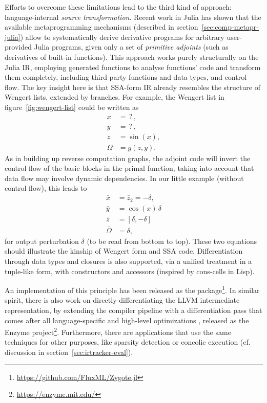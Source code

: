 Efforts to overcome these limitations lead to the third kind of approach: language-internal
\emph{source transformation}.  Recent work in Julia \parencite{innes2018don} has shown that the
available metaprogramming mechanisms (described in section~\ref{sec:comp-metapr-julia}) allow to
systematically derive derivative programs for arbitrary user-provided Julia programs, given only a
set of \emph{primitive adjoints} (such as derivatives of built-in functions).  This approach works
purely structurally on the Julia IR, employing generated functions to analyse functions' code and
transform them completely, including third-party functions and data types, and control flow.  The
key insight here is that SSA-form IR already resembles the structure of Wengert lists, extended by
branches.  For example, the Wengert list in figure~\ref{fig:wengert-list} could be written as
\begin{equation}
  \label{eq:ad-primal-0}
  \begin{aligned}
    x &= \operatorname{?}, \\
    y &= \operatorname{?}, \\
    z &= \sin(x), \\
    \Omega &= g(z, y).
  \end{aligned}
\end{equation}
As in building up reverse computation graphs, the adjoint code will invert the control flow of the
basic blocks in the primal function, taking into account that data flow may involve dynamic
dependencies.  In our little example (without control flow), this leads to
\begin{equation}
  \label{eq:ad-backward-0}
  \begin{aligned}
    \bar{x} &= \bar{z}_2 = -\delta, \\
    \bar{y} &= \cos(x) \, \delta\\
    \bar{z} &= [\delta, -\delta] \\
    \bar{\Omega} &= \delta,
  \end{aligned}
\end{equation}
for output perturbation \(\delta\) (to be read from bottom to top).  These two equations
should illustrate the kinship of Wengert form and SSA code.  Differentiation through data types and
closures is also supported, via a unified treatment in a tuple-like form, with constructors and
accessors (inspired by cons-cells in Lisp).

An implementation of this principle has been released as the 
package\footnote{\url{https://github.com/FluxML/Zygote.jl}}.  In similar spirit, there is also work
on directly differentiating the LLVM intermediate representation, by extending the compiler pipeline
with a differentiation pass that comes after all language-specific and high-level optimizations
\parencite{moses2020instead}, released as the Enzyme
project\footnote{\protect\url{https://enzyme.mit.edu/}}.  Furthermore, there are applications that
use the same techniques for other purposes, like sparsity detection \parencite{gowda2019sparsity} or
concolic execution \parencite{churavy2019vchuravy} (cf. discussion in
section~\ref{sec:irtracker-eval}).

